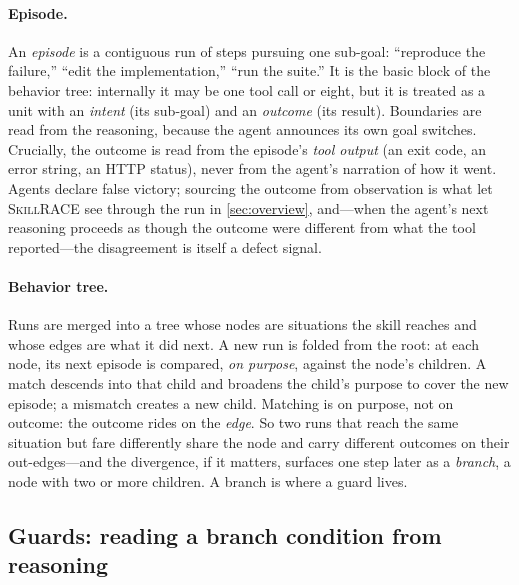 \documentclass[acmsmall,screen,review,anonymous]{acmart}
\newcommand{\tool}{\textsc{SkillRACE}\xspace}
\begin{document}
\paragraph{Episode.} An \emph{episode} is a contiguous run of steps pursuing one
sub-goal: ``reproduce the failure,'' ``edit the implementation,'' ``run the suite.'' It
is the basic block of the behavior tree: internally it may be one tool call or eight,
but it is treated as a unit with an \emph{intent} (its sub-goal) and an \emph{outcome}
(its result). Boundaries are read from the reasoning, because the agent announces its
own goal switches. Crucially, the outcome is read from the episode's \emph{tool output}
(an exit code, an error string, an HTTP status), never from the agent's narration of how
it went. Agents declare false victory; sourcing the outcome from observation is what let
\tool see through the run in \cref{sec:overview}, and---when the agent's next reasoning
proceeds as though the outcome were different from what the tool reported---the
disagreement is itself a defect signal.

\paragraph{Behavior tree.} Runs are merged into a tree whose nodes are situations the
skill reaches and whose edges are what it did next. A new run is folded from the root:
at each node, its next episode is compared, \emph{on purpose}, against the node's
children. A match descends into that child and broadens the child's purpose to cover
the new episode; a mismatch creates a new child. Matching is on purpose, not on
outcome: the outcome rides on the \emph{edge}. So two runs that reach the same situation
but fare differently share the node and carry different outcomes on their out-edges---and
the divergence, if it matters, surfaces one step later as a \emph{branch}, a node with
two or more children. A branch is where a guard lives.

\subsection{Guards: reading a branch condition from reasoning}
\label{sec:guards}
\end{document}
